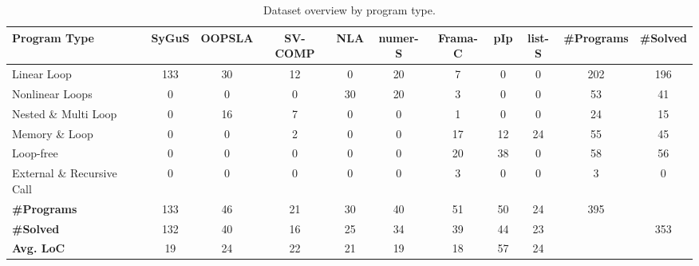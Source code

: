 \begin{table}[htbp]
\centering
\small
\renewcommand{\arraystretch}{0.95}
\setlength{\tabcolsep}{4pt}
\caption{Dataset overview by program type.}
\label{tab:dataset_overview}
\begin{adjustbox}{max width=\textwidth}
\begin{tabular}{
    l
    c
    c
    c
    c
    c
    c
    c
    c
    c
    c
}
\toprule
\textbf{Program Type}  & \textbf{SyGuS} & \textbf{OOPSLA}   & \textbf{SV-COMP}  & \textbf{NLA}  & \textbf{numer-S}  & \textbf{Frama-C}  & \textbf{pIp}  & \textbf{list-S} & \textbf{\#Programs} & \textbf{\#Solved} \\
\midrule
Linear Loop                  & {\cellcolor{figloop!68}133} & {\cellcolor{figloop!55}30} & {\cellcolor{figloop!38}12} & {\cellcolor{figloop!18}0}  & {\cellcolor{figloop!43}20} & {\cellcolor{figcontract!32}7}  & {\cellcolor{figcontract!18}0}  & {\cellcolor{figcontract!18}0}  & 202 & 196 \\
Nonlinear Loops              & {\cellcolor{figloop!18}0}   & {\cellcolor{figloop!18}0}  & {\cellcolor{figloop!18}0}  & {\cellcolor{figloop!55}30} & {\cellcolor{figloop!43}20} & {\cellcolor{figcontract!24}3}  & {\cellcolor{figcontract!18}0}  & {\cellcolor{figcontract!18}0}  & 53  & 41  \\
Nested \& Multi Loop         & {\cellcolor{figloop!18}0}   & {\cellcolor{figloop!40}16} & {\cellcolor{figloop!28}7}  & {\cellcolor{figloop!18}0}  & {\cellcolor{figloop!18}0}  & {\cellcolor{figcontract!20}1}  & {\cellcolor{figcontract!18}0}  & {\cellcolor{figcontract!18}0}  & 24  & 15  \\
Memory \& Loop               & {\cellcolor{figloop!18}0}   & {\cellcolor{figloop!18}0}  & {\cellcolor{figloop!22}2}  & {\cellcolor{figloop!18}0}  & {\cellcolor{figloop!18}0}  & {\cellcolor{figcontract!38}17} & {\cellcolor{figcontract!35}12} & {\cellcolor{figcontract!38}24} & 55 & 45  \\
Loop-free               & {\cellcolor{figloop!18}0}   & {\cellcolor{figloop!18}0}  & {\cellcolor{figloop!18}0}  & {\cellcolor{figloop!18}0}  & {\cellcolor{figloop!18}0}  & {\cellcolor{figcontract!48}20} & {\cellcolor{figcontract!62}38} & {\cellcolor{figcontract!18}0}  & 58  & 56  \\
External \& Recursive Call  & {\cellcolor{figloop!18}0}   & {\cellcolor{figloop!18}0}  & {\cellcolor{figloop!18}0}  & {\cellcolor{figloop!18}0}  & {\cellcolor{figloop!18}0}  & {\cellcolor{figcontract!24}3}  & {\cellcolor{figcontract!18}0}  & {\cellcolor{figcontract!18}0}  & 3   & 0   \\
\midrule
\textbf{\#Programs} & 133 & 46 & 21 & 30 & 40 &  51 & 50 & 24 & 395  \\
\textbf{\#Solved}  & 132 & 40 & 16 & 25 & 34 &  39 & 44 & 23 &      & 353 \\
\textbf{Avg. LoC}  & 19  & 24 & 22 & 21 & 19 &  18 & 57 & 24 &      &     \\
\bottomrule
\end{tabular}%
\end{adjustbox}
\end{table}

